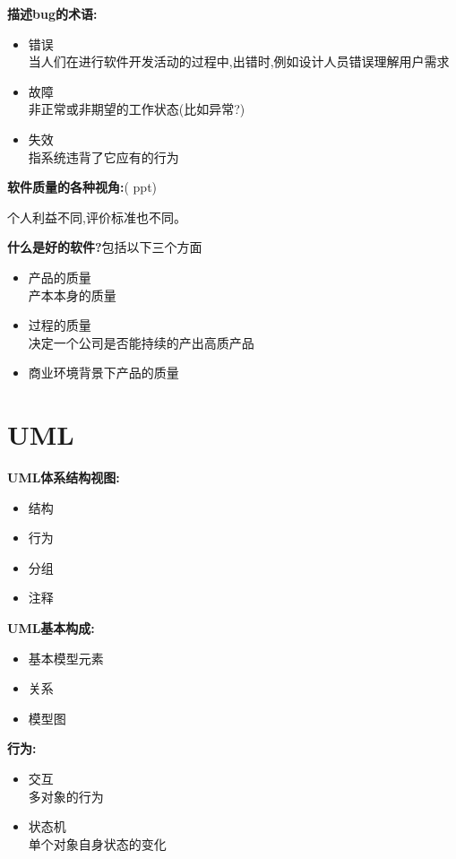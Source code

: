 \documentclass[UTF8,a4paper]{ctexart}
\newcommand{\spaceline}{\vspace{\baselineskip}}
\begin{document}
  \spaceline
  \textbf{描述bug的术语:}
  \begin{itemize}
    \item 错误\\
    当人们在进行软件开发活动的过程中,出错时,例如设计人员错误理解用户需求
    \item 故障\\
    非正常或非期望的工作状态(比如异常?)
    \item 失效\\
    指系统违背了它应有的行为
  \end{itemize}

  \spaceline
  \textbf{软件质量的各种视角:}(\color{red} ppt)

  个人利益不同,评价标准也不同。

  \spaceline
  \textbf{什么是好的软件?}包括以下三个方面
  \begin{itemize}
    \item 产品的质量\\
    产本本身的质量
    \item 过程的质量\\
    决定一个公司是否能持续的产出高质产品
    \item 商业环境背景下产品的质量
  \end{itemize}

\section{UML}

\textbf{UML体系结构视图:}
\begin{itemize}
  \item 结构
  \item 行为
  \item 分组
  \item 注释
\end{itemize}

\textbf{UML基本构成:}
\begin{itemize}
  \item 基本模型元素
  \item 关系
  \item 模型图
\end{itemize}

\textbf{行为:}
\begin{itemize}
  \item 交互\\
  多对象的行为
  \item 状态机\\
  单个对象自身状态的变化
\end{itemize}
\end{document}
